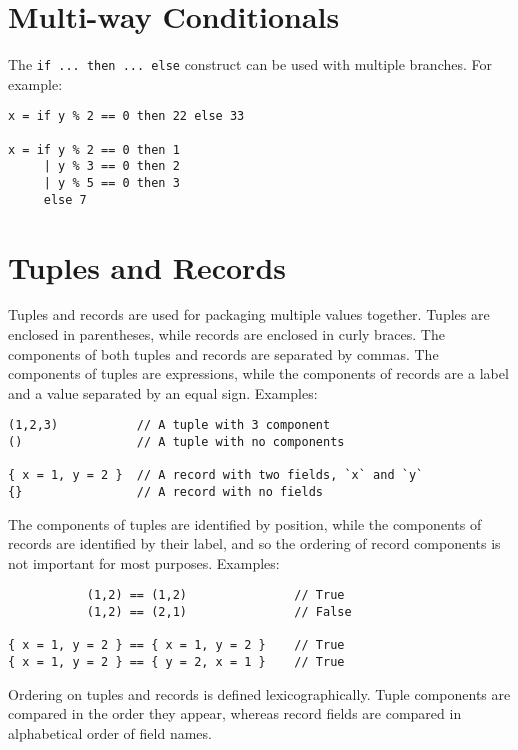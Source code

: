 \hypertarget{multi-way-conditionals}{%
\section{Multi-way Conditionals}\label{multi-way-conditionals}}

The \texttt{if\ ...\ then\ ...\ else} construct can be used with
multiple branches. For example:

\begin{verbatim}
x = if y % 2 == 0 then 22 else 33

x = if y % 2 == 0 then 1
     | y % 3 == 0 then 2
     | y % 5 == 0 then 3
     else 7
\end{verbatim}

\hypertarget{tuples-and-records}{%
\section{Tuples and Records}\label{tuples-and-records}}

Tuples and records are used for packaging multiple values together.
Tuples are enclosed in parentheses, while records are enclosed in curly
braces. The components of both tuples and records are separated by
commas. The components of tuples are expressions, while the components
of records are a label and a value separated by an equal sign. Examples:

\begin{verbatim}
(1,2,3)           // A tuple with 3 component
()                // A tuple with no components

{ x = 1, y = 2 }  // A record with two fields, `x` and `y`
{}                // A record with no fields
\end{verbatim}

The components of tuples are identified by position, while the
components of records are identified by their label, and so the ordering
of record components is not important for most purposes. Examples:

\begin{verbatim}
           (1,2) == (1,2)               // True
           (1,2) == (2,1)               // False

{ x = 1, y = 2 } == { x = 1, y = 2 }    // True
{ x = 1, y = 2 } == { y = 2, x = 1 }    // True
\end{verbatim}

Ordering on tuples and records is defined lexicographically. Tuple
components are compared in the order they appear, whereas record fields
are compared in alphabetical order of field names.

